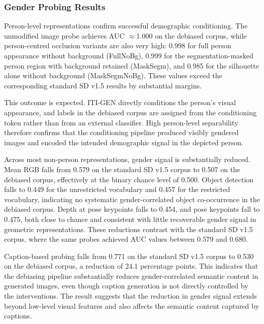 \subsubsection{Gender Probing Results}

Person-level representations confirm successful demographic conditioning. The unmodified image probe achieves AUC $\approx$1.000 on the debiased corpus, while person-centred occlusion variants are also very high: 0.998 for full person appearance without background (FullNoBg), 0.999 for the segmentation-masked person region with background retained (MaskSegm), and 0.985 for the silhouette alone without background (MaskSegmNoBg). These values exceed the corresponding standard SD v1.5 results by substantial margins.

This outcome is expected. ITI-GEN directly conditions the person's visual appearance, and labels in the debiased corpus are assigned from the conditioning token rather than from an external classifier. High person-level separability therefore confirms that the conditioning pipeline produced visibly gendered images and encoded the intended demographic signal in the depicted person.

Across most non-person representations, gender signal is substantially reduced. Mean RGB falls from 0.579 on the standard SD v1.5 corpus to 0.507 on the debiased corpus, effectively at the binary chance level of 0.500. Object detection falls to 0.449 for the unrestricted vocabulary and 0.457 for the restricted vocabulary, indicating no systematic gender-correlated object co-occurrence in the debiased corpus. Depth at pose keypoints falls to 0.454, and pose keypoints fall to 0.475, both close to chance and consistent with little recoverable gender signal in geometric representations. These reductions contrast with the standard SD v1.5 corpus, where the same probes achieved AUC values between 0.579 and 0.680.

Caption-based probing falls from 0.771 on the standard SD v1.5 corpus to 0.530 on the debiased corpus, a reduction of 24.1 percentage points. This indicates that the debiasing pipeline substantially reduces gender-correlated semantic content in generated images, even though caption generation is not directly controlled by the interventions. The result suggests that the reduction in gender signal extends beyond low-level visual features and also affects the semantic content captured by captions.

